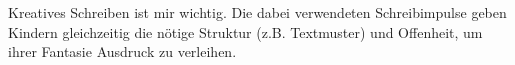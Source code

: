 Kreatives Schreiben ist mir wichtig.
Die dabei verwendeten Schreibimpulse geben Kindern gleichzeitig die nötige Struktur (z.B. Textmuster) und Offenheit, um ihrer Fantasie Ausdruck zu verleihen.